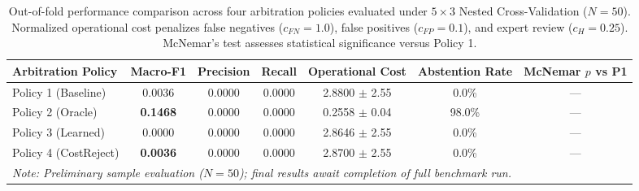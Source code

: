 \begin{table}[t]
\centering
\caption{Out-of-fold performance comparison across four arbitration policies evaluated under $5 \times 3$ Nested Cross-Validation ($N=50$). Normalized operational cost penalizes false negatives ($c_{FN}=1.0$), false positives ($c_{FP}=0.1$), and expert review ($c_H=0.25$). McNemar's test assesses statistical significance versus Policy 1.}
\label{tab:policy_benchmark}
\small
\begin{tabular}{lcccccc}
\toprule
\textbf{Arbitration Policy} & \textbf{Macro-F1} & \textbf{Precision} & \textbf{Recall} & \textbf{Operational Cost} & \textbf{Abstention Rate} & \textbf{McNemar $p$ vs P1} \\
\midrule
Policy 1 (Baseline) & 0.0036 & 0.0000 & 0.0000 & 2.8800 $\pm$ 2.55 & 0.0\% & --- \\
Policy 2 (Oracle) & \textbf{0.1468} & 0.0000 & 0.0000 & 0.2558 $\pm$ 0.04 & 98.0\% & --- \\
Policy 3 (Learned) & 0.0000 & 0.0000 & 0.0000 & 2.8646 $\pm$ 2.55 & 0.0\% & --- \\
Policy 4 (CostReject) & \textbf{0.0036} & 0.0000 & 0.0000 & 2.8700 $\pm$ 2.55 & 0.0\% & --- \\
\midrule
\multicolumn{7}{l}{\textit{Note: Preliminary sample evaluation ($N=50$); final results await completion of full benchmark run.}} \\
\bottomrule
\end{tabular}
\end{table}
